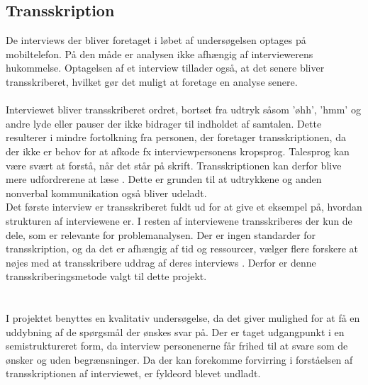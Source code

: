 \subsection{Transskription}
De interviews der bliver foretaget i løbet af undersøgelsen optages på mobiltelefon. På den måde er analysen ikke afhængig af interviewerens hukommelse. Optagelsen af et interview tillader også, at det senere bliver transskriberet, hvilket gør det muligt at foretage en analyse senere. 
\\
\\
Interviewet bliver transskriberet ordret, bortset fra udtryk såsom 'øhh', 'hmm' og andre lyde eller pauser der ikke bidrager til indholdet af samtalen. Dette resulterer i mindre fortolkning fra personen, der foretager transskriptionen, da der ikke er behov for at afkode fx interviewpersonens kropsprog. Talesprog kan være svært at forstå, når det står på skrift. Transskriptionen kan derfor blive mere udfordrerene at læse \citep{kvale2015}. Dette er grunden til at udtrykkene og anden nonverbal kommunikation også bliver udeladt. 
\\
Det første interview er transskriberet fuldt ud for at give et eksempel på, hvordan strukturen af interviewene er. I resten af interviewene transskriberes der kun de dele, som er relevante for problemanalysen. Der er ingen standarder for transskription, og da det er afhængig af tid og ressourcer, vælger flere forskere at nøjes med at transskribere uddrag af deres interviews \citep{brinkmann2014}\citep{kvale2015}. Derfor er denne transskriberingsmetode valgt til dette projekt.
\\\\\\
I projektet benyttes en kvalitativ undersøgelse, da det giver mulighed for at få en uddybning af de spørgsmål der ønskes svar på. Der er taget udgangpunkt i en semistruktureret form, da interview personenerne får frihed til at svare som de ønsker og uden begrænsninger. Da der kan forekomme forvirring i forståelsen af transskriptionen af interviewet, er fyldeord blevet undladt.
